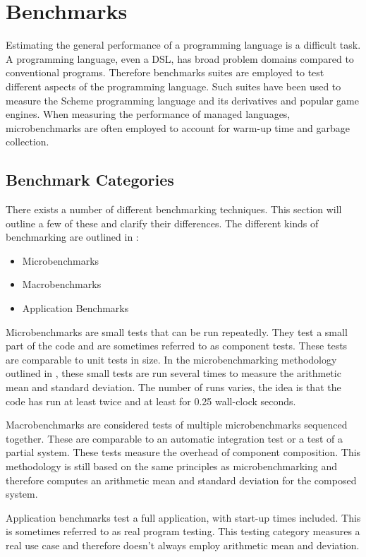 \section{Benchmarks}
Estimating the general performance of a programming language is a difficult task. A programming language, even a \gls{DSL}, has broad problem domains compared to conventional programs. Therefore benchmarks suites are employed to test different aspects of the programming language. Such suites have been used to measure the Scheme programming language and its derivatives\cite{bauman2015pycket, strickland2012chaperones} and popular game engines\cite{p92018gameplay}. When measuring the performance of managed languages, microbenchmarks are often employed to account for warm-up time and garbage collection\cite{sestoft2013microbenchmarks}.

\subsection{Benchmark Categories}
There exists a number of different benchmarking techniques. This section will outline a few of these and clarify their differences. The different kinds of benchmarking are outlined in \cite{p92018gameplay}:
\begin{itemize}
  \item Microbenchmarks
  \item Macrobenchmarks
  \item Application Benchmarks
\end{itemize}

Microbenchmarks are small tests that can be run repeatedly. They test a small part of the code and are sometimes referred to as component tests. These tests are comparable to unit tests in size. In the microbenchmarking methodology outlined in \cite{sestoft2013microbenchmarks}, these small tests are run several times to measure the arithmetic mean and standard deviation. The number of runs varies, the idea is that the code has run at least twice and at least for 0.25 wall-clock seconds.

Macrobenchmarks are considered tests of multiple microbenchmarks sequenced together. These are comparable to an automatic integration test or a test of a partial system. These tests measure the overhead of component composition. This methodology is still based on the same principles as microbenchmarking and therefore computes an arithmetic mean and standard deviation for the composed system.

Application benchmarks test a full application, with start-up times included. This is sometimes referred to as real program testing. This testing category measures a real use case and therefore doesn't always employ arithmetic mean and deviation.
